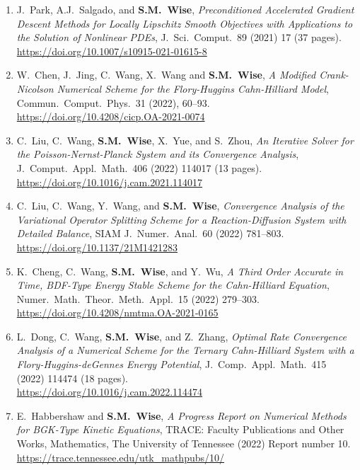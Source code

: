 \documentclass[11pt]{letter}
\begin{document}
\begin{enumerate}
	\item
J.~Park, A.J.~Salgado, and \textbf{S.M.~Wise}, {\sl Preconditioned Accelerated Gradient Descent Methods for Locally Lipschitz Smooth Objectives with Applications to the Solution of Nonlinear PDEs}, J.~Sci.~Comput.~89 (2021) 17 (37 pages).
	\\ 
\url{https://doi.org/10.1007/s10915-021-01615-8}

	\item
W.~Chen, J.~Jing, C.~Wang, X.~Wang and \textbf{S.M.~Wise}, {\sl A Modified Crank-Nicolson Numerical Scheme for the Flory-Huggins Cahn-Hilliard Model}, Commun.~Comput.~Phys.~31 (2022), 60--93.
	\\ 
\url{https://doi.org/10.4208/cicp.OA-2021-0074}

	\item
C.~Liu, C.~Wang, \textbf{S.M.~Wise}, X.~Yue, and S.~Zhou, {\sl An Iterative Solver for the Poisson-Nernst-Planck System and its Convergence Analysis},  J.~Comput.~Appl.~Math.~406 (2022) 114017 (13 pages).
	\\ 
\url{https://doi.org/10.1016/j.cam.2021.114017}

	\item
C.~Liu, C.~Wang, Y.~Wang, and \textbf{S.M.~Wise}, {\sl Convergence Analysis of the Variational Operator Splitting Scheme for a Reaction-Diffusion System with Detailed Balance}, SIAM J.~Numer.~Anal.~60 (2022) 781--803.
	\\
\url{https://doi.org/10.1137/21M1421283}

	\item
K.~Cheng, C.~Wang, \textbf{S.M.~Wise}, and Y.~Wu, {\sl A Third Order Accurate in Time, BDF-Type Energy Stable Scheme for the Cahn-Hilliard Equation}, Numer.~Math.~Theor.~Meth.~Appl.~15 (2022) 279--303.
	\\
\url{https://doi.org/10.4208/nmtma.OA-2021-0165}

	\item
L.~Dong, C.~Wang, \textbf{S.M.~Wise}, and Z.~Zhang, {\sl Optimal Rate Convergence Analysis of a Numerical Scheme for the Ternary Cahn-Hilliard System with a Flory-Huggins-deGennes Energy Potential}, J.~Comp.~Appl.~Math.~415 (2022) 114474 (18 pages).
	\\
\url{https://doi.org/10.1016/j.cam.2022.114474}

	\item
E.~Habbershaw and \textbf{S.M.~Wise}, {\sl A Progress Report on Numerical Methods for BGK-Type Kinetic Equations}, TRACE: Faculty Publications and Other Works, Mathematics, The University of Tennessee (2022) Report number 10.
 	\\
\url{https://trace.tennessee.edu/utk_mathpubs/10/}


\end{enumerate}
\end{document}
